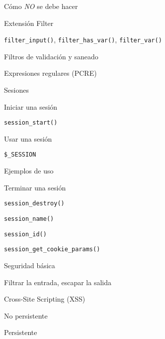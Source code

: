 \begin{longenum}
\begin{longenum}
\begin{longenum}
            \item Cómo \textit{NO} se debe hacer
            \item Extensión Filter
            \begin{longenum}
                \item \texttt{filter\_input()}, \texttt{filter\_has\_var()}, \texttt{filter\_var()}
                \item Filtros de validación y saneado
            \end{longenum}
            \item Expresiones regulares (PCRE)
        \end{longenum}
        \item Sesiones
        \begin{longenum}
            \item Iniciar una sesión
            \begin{longenum}
                \item \texttt{session\_start()}
            \end{longenum}
            \item Usar una sesión
            \begin{longenum}
                \item \texttt{\$\_SESSION}
                \item Ejemplos de uso
            \end{longenum}
            \item Terminar una sesión
            \begin{longenum}
                \item \texttt{session\_destroy()}
                \item \texttt{session\_name()}
                \item \texttt{session\_id()}
                \item \texttt{session\_get\_cookie\_params()}
            \end{longenum}
        \end{longenum}
        \item Seguridad básica
        \begin{longenum}
            \item Filtrar la entrada, escapar la salida
            \item Cross-Site Scripting (XSS)
            \begin{longenum}
                \item No persistente
                \item Persistente

\end{longenum}
\end{longenum}
\end{longenum}
\end{longenum}
